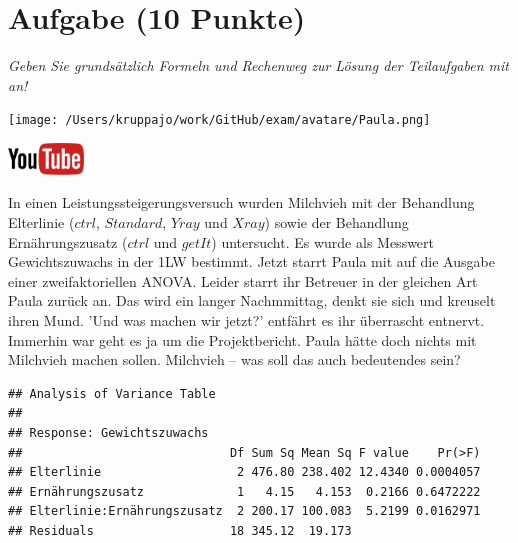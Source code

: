 \documentclass[a4paper, 9pt]{scrartcl}\usepackage[]{graphicx}\usepackage[]{xcolor}
\makeatletter
\newenvironment{kframe}{%
 \def\at@end@of@kframe{}%
 \ifinner\ifhmode%
  \def\at@end@of@kframe{\end{minipage}}%
  \begin{minipage}{\columnwidth}%
 \fi\fi%
 \def\FrameCommand##1{\hskip\@totalleftmargin \hskip-\fboxsep
 \colorbox{shadecolor}{##1}\hskip-\fboxsep
     \hskip-\linewidth \hskip-\@totalleftmargin \hskip\columnwidth}%
 \MakeFramed {\advance\hsize-\width
   \@totalleftmargin\z@ \linewidth\hsize
   \@setminipage}}%
 {\par\unskip\endMakeFramed%
 \at@end@of@kframe}
\newenvironment{knitrout}{}{} %
\makeatother
\begin{document}
\section{Aufgabe \hfill (10 Punkte)}

\textit{Geben Sie grundsätzlich Formeln und Rechenweg zur Lösung der Teilaufgaben mit an!} \\[1Ex]
 

 
\begin{minipage}[t]{0.5\textwidth}
\texttt{[image: /Users/kruppajo/work/GitHub/exam/avatare/Paula.png]}
\end{minipage}
\begin{minipage}[t]{0.5\textwidth}
\hfill
\href{https://youtu.be/rWTyHXXlYjY}{\includegraphics[width = 2cm]{img/youtube}}\\[1Ex]
\end{minipage}
\vspace{1ex}



In einen Leistungssteigerungsversuch wurden Milchvieh mit der Behandlung Elterlinie ($ctrl$, $Standard$, $Yray$ und $Xray$) sowie der Behandlung Ernährungszusatz ($ctrl$ und $getIt$) untersucht. Es wurde als Messwert Gewichtszuwachs in der 1LW bestimmt. Jetzt starrt Paula mit auf die \Rlogo Ausgabe einer zweifaktoriellen ANOVA. Leider starrt ihr Betreuer in der gleichen Art Paula zurück an. Das wird ein langer Nachmmittag, denkt sie sich und kreuselt ihren Mund. 'Und was machen wir jetzt?' entfährt es ihr überrascht entnervt. Immerhin war geht es ja um die Projektbericht. Paula hätte doch nichts mit Milchvieh machen sollen. Milchvieh -- was soll das auch bedeutendes sein?

\begin{knitrout}
\color{fgcolor}\begin{kframe}
\begin{verbatim}
## Analysis of Variance Table
## 
## Response: Gewichtszuwachs
##                             Df Sum Sq Mean Sq F value    Pr(>F)
## Elterlinie                   2 476.80 238.402 12.4340 0.0004057
## Ernährungszusatz             1   4.15   4.153  0.2166 0.6472222
## Elterlinie:Ernährungszusatz  2 200.17 100.083  5.2199 0.0162971
## Residuals                   18 345.12  19.173
\end{verbatim}
\end{kframe}
\end{knitrout}
\end{document}
